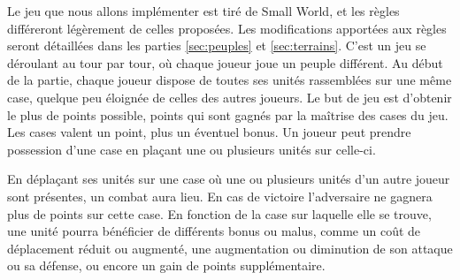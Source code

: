 Le jeu que nous allons implémenter est tiré de Small World, et les règles différeront légèrement de celles proposées. Les modifications apportées aux règles seront détaillées dans les parties \ref{sec:peuples} et \ref{sec:terrains}.
C'est un jeu se déroulant au tour par tour, où chaque joueur joue un peuple différent. Au début de la partie, chaque joueur dispose de toutes ses unités rassemblées sur une même case, quelque peu éloignée de celles des autres joueurs.
Le but de jeu est d'obtenir le plus de points possible, points qui sont gagnés par la maîtrise des cases du jeu. Les cases valent un point, plus un éventuel bonus. Un joueur peut prendre possession d'une case en plaçant une ou plusieurs unités sur celle-ci.

En déplaçant ses unités sur une case où une ou plusieurs unités d'un autre joueur sont présentes, un combat aura lieu. En cas de victoire l'adversaire ne gagnera plus de points sur cette case.
En fonction de la case sur laquelle elle se trouve, une unité pourra bénéficier de différents bonus ou malus, comme un coût de déplacement réduit ou augmenté, une augmentation ou diminution de son attaque ou sa défense, ou encore un gain de points supplémentaire.